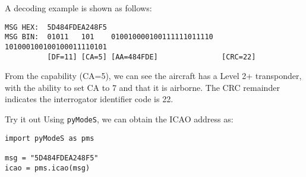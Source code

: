 A decoding example is shown as follows:

\begin{verbatim}
MSG HEX:  5D484FDEA248F5
MSG BIN:  01011   101    010010000100111111011110  101000100100100011110101
          [DF=11] [CA=5] [AA=484FDE]               [CRC=22]
\end{verbatim}

From the capability (CA=5), we can see the aircraft has a Level 2+ transponder, with the ability to set CA to 7 and that it is airborne. The CRC remainder indicates the interrogator identifier code is 22.

\begin{notebox}{Try it out}
Using \texttt{pyModeS}, we can obtain the ICAO address as: 

\begin{verbatim}
import pyModeS as pms

msg = "5D484FDEA248F5"
icao = pms.icao(msg)
\end{verbatim}

\end{notebox}